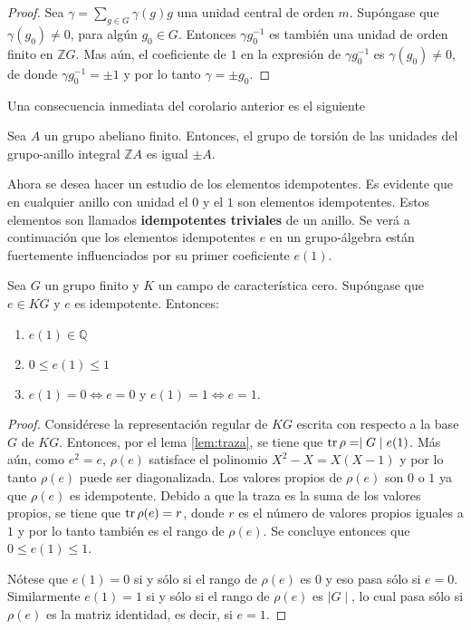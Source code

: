 \begin{proof}
Sea $\gamma = \sum_{g \in G}\gamma(g)g$ una unidad central de orden $m$. Supóngase que $\gamma(g_0) \neq 0$, para algún $g_0 \in G$. Entonces $\gamma g_0^{-1}$ es también una unidad de orden finito en $\mathds{Z}G$. Mas aún, el coeficiente de $1$ en la expresión de $\gamma g_0^{-1}$ es $\gamma(g_0) \neq 0$, de donde $\gamma g_0^{-1} = \pm 1$ y por lo tanto $\gamma = \pm g_0$.
\end{proof}
Una consecuencia inmediata del corolario anterior es el siguiente
\begin{teorema}\label{teo:Graham-Higman}
Sea $A$ un grupo abeliano finito. Entonces, el grupo de torsión de las unidades del grupo-anillo integral $\mathds{Z}A$ es igual $\pm A$.
\end{teorema}

Ahora se desea hacer un estudio de los elementos idempotentes. Es evidente que en cualquier anillo con unidad el $0$ y el $1$ son elementos idempotentes. Estos elementos son llamados \textbf{idempotentes triviales} de un anillo. Se verá a continuación que los elementos idempotentes $e$ en un grupo-álgebra están fuertemente influenciados por su primer coeficiente $e(1)$.

\begin{teorema}\label{teo:idme}
Sea $G$ un grupo finito y $K$ un campo de característica cero. Supóngase que $e \in KG$ y $e$ es idempotente. Entonces:
\begin{enumerate}
\item $e(1) \in \mathds{Q}$
\item $0 \leq e(1) \leq 1$
\item $e(1) = 0 \Leftrightarrow e = 0$ y $e(1) = 1 \Leftrightarrow e=1$.   
\end{enumerate} 
\end{teorema}
\begin{proof}
Considérese la representación regular de $KG$ escrita con respecto a la base $G$ de $KG$. Entonces, por el lema \ref{lem:traza}, se tiene que $\operatorname{tr}\rho = \mid G \mid e(1)$. Más aún, como $e^2 = e$, $\rho(e)$ satisface el polinomio $X^2 - X = X(X-1)$ y por lo tanto $\rho(e)$ puede ser diagonalizada. Los valores propios de $\rho(e)$ son $0$ o $1$ ya que $\rho(e)$ es idempotente. Debido a que la traza es la suma de los valores propios, se tiene que $\operatorname{tr}\rho(e) = r$, donde $r$ es el número de valores propios iguales a $1$ y por lo tanto también es el rango de $\rho(e)$. Se concluye entonces que $0\leq e(1) \leq 1$.

Nótese que $e(1) = 0 $ si y sólo si el rango de $\rho(e)$ es $0$ y eso pasa sólo si $e = 0$. Similarmente $e(1) = 1$ si y sólo si el rango de $\rho(e)$ es $\mid G \mid $, lo cual pasa sólo si $\rho(e)$ es la matriz identidad, es decir, si $e = 1$. 
\end{proof} 


